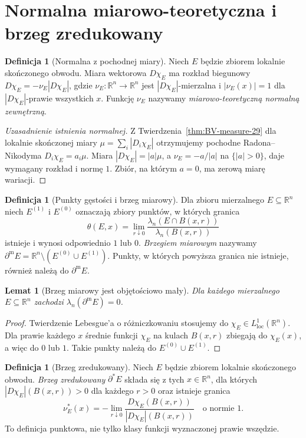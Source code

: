 \documentclass[11pt,a4paper,oneside]{book}
\numberwithin{equation}{chapter}
\theoremstyle{plain}
\newtheorem{lemat}[twierdzenie]{Lemat}
\theoremstyle{definition}
\newtheorem{definicja}[twierdzenie]{Definicja}
\theoremstyle{remark}
\begin{document}
\section{Normalna miarowo-teoretyczna i brzeg zredukowany}
\begin{definicja}[Normalna z pochodnej miary]
\label{def:normal-BV-29}
Niech $E$ będzie zbiorem lokalnie skończonego obwodu.
Miara wektorowa $D\chi_E$ ma rozkład biegunowy
$D\chi_E=-\nu_E|D\chi_E|$, gdzie
$\nu_E:\mathbb R^n\to\mathbb R^n$ jest
$|D\chi_E|$-mierzalna i
$|\nu_E(x)|=1$ dla $|D\chi_E|$-prawie wszystkich $x$.
Funkcję $\nu_E$ nazywamy \emph{miarowo-teoretyczną
normalną zewnętrzną}.
\end{definicja}

\begin{proof}[Uzasadnienie istnienia normalnej]
Z Twierdzenia~\ref{thm:BV-measure-29} dla lokalnie
skończonej miary $\mu=\sum_i|D_i\chi_E|$
otrzymujemy pochodne Radona--Nikodyma
$D_i\chi_E=a_i\mu$. Miara
$|D\chi_E|=|a|\mu$, a $\nu_E=-a/|a|$ na
$\{|a|>0\}$, daje wymagany rozkład i normę $1$.
Zbiór, na którym $a=0$, ma zerową miarę wariacji.
\end{proof}

\begin{definicja}[Punkty gęstości i brzeg miarowy]
\label{def:measure-boundary-29}
Dla zbioru mierzalnego $E\subseteq\mathbb R^n$
niech $E^{(1)}$ i $E^{(0)}$ oznaczają zbiory punktów,
w których granica
\[
 \theta(E,x)=\lim_{r\downarrow0}
 \frac{\lambda_n(E\cap B(x,r))}{\lambda_n(B(x,r))}
\]
istnieje i wynosi odpowiednio $1$ lub $0$.
\emph{Brzegiem miarowym} nazywamy
$\partial^{\mathrm m}E=\mathbb R^n\setminus(E^{(0)}\cup E^{(1)})$.
Punkty, w których powyższa granica nie istnieje,
również należą do $\partial^{\mathrm m}E$.
\end{definicja}

\begin{lemat}[Brzeg miarowy jest objętościowo mały]
\label{lem:essential-boundary-null-29}
Dla każdego mierzalnego $E\subseteq\mathbb R^n$
zachodzi $\lambda_n(\partial^{\mathrm m}E)=0$.
\end{lemat}
\begin{proof}
Twierdzenie Lebesgue'a o różniczkowaniu stosujemy
do $\chi_E\in L^1_{\mathrm{loc}}(\mathbb R^n)$.
Dla prawie każdego $x$ średnie funkcji $\chi_E$
na kulach $B(x,r)$ zbiegają do $\chi_E(x)$,
a więc do $0$ lub $1$. Takie punkty należą
do $E^{(0)}\cup E^{(1)}$.
\end{proof}

\begin{definicja}[Brzeg zredukowany]
\label{def:reduced-boundary-29}
Niech $E$ będzie zbiorem lokalnie skończonego obwodu.
\emph{Brzeg zredukowany} $\partial^*E$ składa się
z tych $x\in\mathbb R^n$, dla których
$|D\chi_E|(B(x,r))>0$ dla każdego $r>0$
oraz istnieje granica
\[
 \nu_E^*(x)=-\lim_{r\downarrow0}
 \frac{D\chi_E(B(x,r))}{|D\chi_E|(B(x,r))}
 \quad\text{o normie }1.
\]
To definicja punktowa, nie tylko klasy funkcji
wyznaczonej prawie wszędzie.
\end{definicja}
\end{document}
